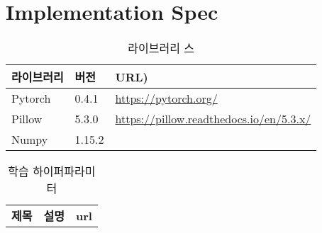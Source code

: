 \section{Implementation Spec}

\begin{table}[H]
	\label{tab:library_spec}
	\caption{라이브러리 스}
	\centering
	\begin{tabular}{|C{2.0cm}|C{2.0cm}|L{8.0cm}|}
		\toprule
		\textbf{라이브러리} & \textbf{버전} & \textbf{URL)} \\
		\toprule
		Pytorch & 0.4.1 & \url{https://pytorch.org/} \\
		Pillow & 5.3.0 & \url{https://pillow.readthedocs.io/en/5.3.x/}\\
		Numpy & 1.15.2 & 
	\end{tabular}
\end{table}

\begin{table}[H]
	\label{tab:training_spec}
	\caption{학습 하이퍼파라미터}
	\centering
	\begin{tabular}{|C{2.0cm}|C{2.0cm}|C{2.0cm}|}
		\textbf{제목} & \textbf{설명} & \textbf{url} \\
	\end{tabular}
\end{table}
